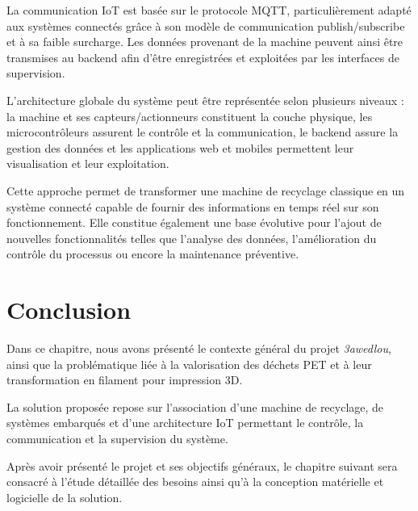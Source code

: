 La communication IoT est basée sur le protocole MQTT, particulièrement
adapté aux systèmes connectés grâce à son modèle de communication
publish/subscribe et à sa faible surcharge. Les données provenant de la
machine peuvent ainsi être transmises au backend afin d'être enregistrées
et exploitées par les interfaces de supervision.

L'architecture globale du système peut être représentée selon plusieurs
niveaux : la machine et ses capteurs/actionneurs constituent la couche
physique, les microcontrôleurs assurent le contrôle et la communication,
le backend assure la gestion des données et les applications web et
mobiles permettent leur visualisation et leur exploitation.

Cette approche permet de transformer une machine de recyclage classique en
un système connecté capable de fournir des informations en temps réel sur
son fonctionnement. Elle constitue également une base évolutive pour
l'ajout de nouvelles fonctionnalités telles que l'analyse des données,
l'amélioration du contrôle du processus ou encore la maintenance
préventive.

\section{Conclusion}

Dans ce chapitre, nous avons présenté le contexte général du projet
\textit{3awedlou}, ainsi que la problématique liée à la valorisation des
déchets PET et à leur transformation en filament pour impression 3D.

La solution proposée repose sur l'association d'une machine de recyclage,
de systèmes embarqués et d'une architecture IoT permettant le contrôle, la
communication et la supervision du système.

Après avoir présenté le projet et ses objectifs généraux, le chapitre
suivant sera consacré à l'étude détaillée des besoins ainsi qu'à la
conception matérielle et logicielle de la solution.
